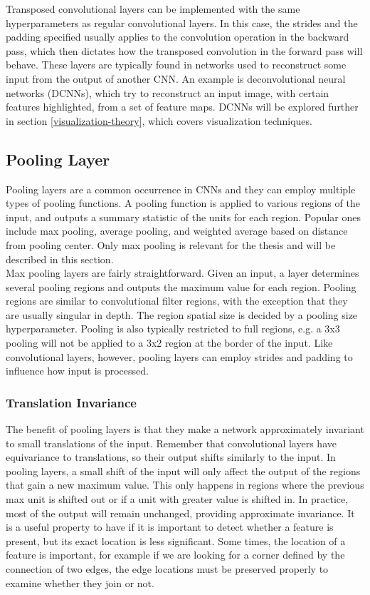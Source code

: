 \noindent Transposed convolutional layers can be implemented with the same hyperparameters as regular convolutional layers. In this case, the strides and the padding specified usually applies to the convolution operation in the backward pass, which then dictates how the transposed convolution in the forward pass will behave. These layers are typically found in networks used to reconstruct some input from the output of another CNN. An example is deconvolutional neural networks (DCNNs), which try to reconstruct an input image, with certain features highlighted, from a set of feature maps. DCNNs will be explored further in section \ref{visualization-theory}, which covers visualization techniques.

\subsection{Pooling Layer}

Pooling layers are a common occurrence in CNNs and they can employ multiple types of pooling functions. A pooling function is applied to various regions of the input, and outputs a summary statistic of the units for each region. Popular ones include max pooling, average pooling, and weighted average based on distance from pooling center. Only max pooling is relevant for the thesis and will be described in this section. \\

\noindent Max pooling layers are fairly straightforward. Given an input, a layer determines several pooling regions and outputs the maximum value for each region. Pooling regions are similar to convolutional filter regions, with the exception that they are usually singular in depth. The region spatial size is decided by a pooling size hyperparameter. Pooling is also typically restricted to full regions, e.g. a 3x3 pooling will not be applied to a 3x2 region at the border of the input. Like convolutional layers, however, pooling layers can employ strides and padding to influence how input is processed.

\subsubsection{Translation Invariance}

The benefit of pooling layers is that they make a network approximately invariant to small translations of the input. Remember that convolutional layers have equivariance to translations, so their output shifts similarly to the input. In pooling layers, a small shift of the input will only affect the output of the regions that gain a new maximum value. This only happens in regions where the previous max unit is shifted out or if a unit with greater value is shifted in. In practice, most of the output will remain unchanged, providing approximate invariance. It is a useful property to have if it is important to detect whether a feature is present, but its exact location is less significant. Some times, the location of a feature is important, for example if we are looking for a corner defined by the connection of two edges, the edge locations must be preserved properly to examine whether they join or not.

